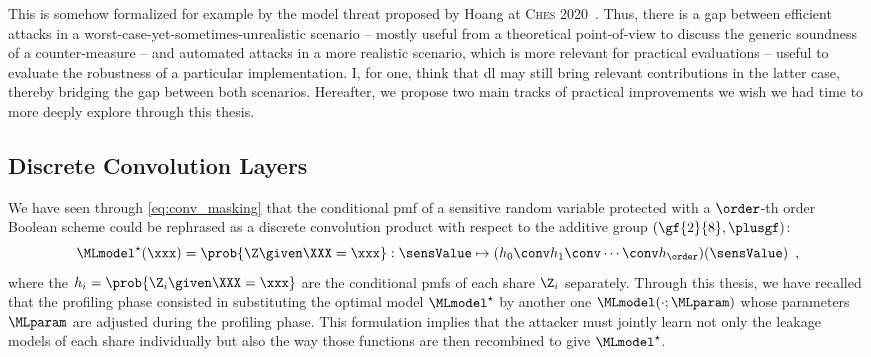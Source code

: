 	This is somehow formalized for example by the model threat proposed by Hoang \etal{} at \textsc{Ches} 2020~\cite[Sec.~4.2.1]{hoang_plaintext_2020}.
	Thus, there is a gap between efficient attacks in a worst-case-yet-sometimes-unrealistic scenario -- mostly useful from a theoretical point-of-view \eg{} to discuss the generic soundness of a counter-measure -- and automated attacks in a more realistic scenario, which is more relevant for practical evaluations -- \eg{} useful to evaluate the robustness of a particular implementation.
	I, for one, think that \gls{dl} may still bring relevant contributions in the latter case, thereby bridging the gap between both scenarios.
	Hereafter, we propose two main tracks of practical improvements we wish we had time to more deeply explore through this thesis.

	\subsection{Discrete Convolution Layers}
		We have seen through \autoref{eq:conv_masking} that the conditional \gls{pmf} of a sensitive random variable protected with a \(\order\)-th order Boolean scheme could be rephrased as a discrete convolution product with respect to the additive group \((\gf{2}{8}, \plusgf)\): 
		\begin{equation}
			\MLmodel^\star(\xxx) = \prob{\Z \given \XXX = \xxx}: \sensValue \mapsto  (h_0 \conv h_1 \conv \cdots \conv h_\order)(\sensValue) \enspace ,
		\end{equation}
		where the \(h_i = \prob{\Z_i \given \XXX = \xxx}\) are the conditional \glspl{pmf} of each share \(\Z_i\) separately.
		Through this thesis, we have recalled that the profiling phase consisted in substituting the optimal model \(\MLmodel^\star\) by another one \(\MLmodel(\cdot; \MLparam)\) whose parameters \(\MLparam\) are adjusted during the profiling phase.
		This formulation implies that the attacker must jointly learn not only the leakage models of each share individually but also the way those functions are then recombined to give \(\MLmodel^\star\).

